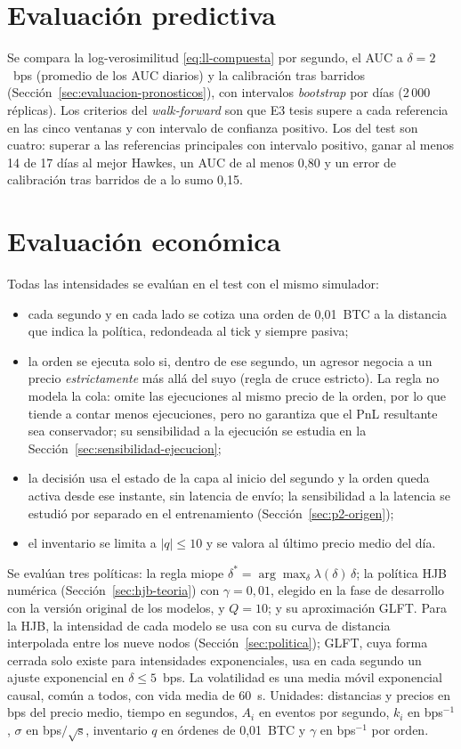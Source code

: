 \section{Evaluación predictiva}
Se compara la log-verosimilitud \eqref{eq:ll-compuesta} por segundo, el AUC a $\delta=2$~bps (promedio de los AUC diarios) y la calibración tras barridos (Sección~\ref{sec:evaluacion-pronosticos}), con intervalos \textit{bootstrap} por días (2\,000 réplicas). Los criterios del \textit{walk-forward} son que E3 tesis supere a cada referencia en las cinco ventanas y con intervalo de confianza positivo. Los del test son cuatro: superar a las referencias principales con intervalo positivo, ganar al menos 14 de 17 días al mejor Hawkes, un AUC de al menos 0,80 y un error de calibración tras barridos de a lo sumo 0,15.

\section{Evaluación económica}
\label{sec:eval-economica}
Todas las intensidades se evalúan en el test con el mismo simulador:
\begin{itemize}[nosep]
\item cada segundo y en cada lado se cotiza una orden de 0,01~BTC a la distancia que indica la política, redondeada al tick y siempre pasiva;
\item la orden se ejecuta solo si, dentro de ese segundo, un agresor negocia a un precio \emph{estrictamente} más allá del suyo (regla de cruce estricto). La regla no modela la cola: omite las ejecuciones al mismo precio de la orden, por lo que tiende a contar menos ejecuciones, pero no garantiza que el PnL resultante sea conservador; su sensibilidad a la ejecución se estudia en la Sección~\ref{sec:sensibilidad-ejecucion};
\item la decisión usa el estado de la capa al inicio del segundo y la orden queda activa desde ese instante, sin latencia de envío; la sensibilidad a la latencia se estudió por separado en el entrenamiento (Sección~\ref{sec:p2-origen});
\item el inventario se limita a $|q|\le10$ y se valora al último precio medio del día.
\end{itemize}
Se evalúan tres políticas: la regla miope $\delta^*=\arg\max_\delta\lambda(\delta)\,\delta$; la política HJB numérica (Sección~\ref{sec:hjb-teoria}) con $\gamma=0{,}01$, elegido en la fase de desarrollo con la versión original de los modelos, y $Q=10$; y su aproximación GLFT. Para la HJB, la intensidad de cada modelo se usa con su curva de distancia interpolada entre los nueve nodos (Sección~\ref{sec:politica}); GLFT, cuya forma cerrada solo existe para intensidades exponenciales, usa en cada segundo un ajuste exponencial en $\delta\le5$~bps. La volatilidad es una media móvil exponencial causal, común a todos, con vida media de 60~s. Unidades: distancias y precios en bps del precio medio, tiempo en segundos, $A_i$ en eventos por segundo, $k_i$ en bps$^{-1}$, $\sigma$ en bps$/\sqrt{\text{s}}$, inventario $q$ en órdenes de 0,01~BTC y $\gamma$ en bps$^{-1}$ por orden.

